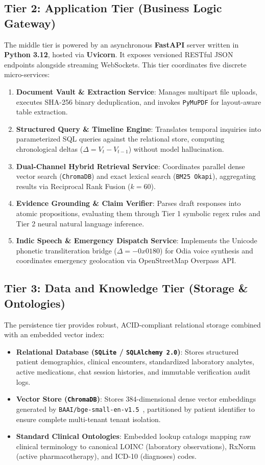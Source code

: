 \subsection{Tier 2: Application Tier (Business Logic Gateway)}
The middle tier is powered by an asynchronous \textbf{FastAPI} server written in \textbf{Python 3.12}, hosted via \textbf{Uvicorn}. It exposes versioned RESTful JSON endpoints alongside streaming WebSockets. This tier coordinates five discrete micro-services:
\begin{enumerate}
    \item \textbf{Document Vault \& Extraction Service}: Manages multipart file uploads, executes SHA-256 binary deduplication, and invokes \texttt{PyMuPDF} for layout-aware table extraction.
    \item \textbf{Structured Query \& Timeline Engine}: Translates temporal inquiries into parameterized SQL queries against the relational store, computing chronological deltas ($\Delta = V_t - V_{t-1}$) without model hallucination.
    \item \textbf{Dual-Channel Hybrid Retrieval Service}: Coordinates parallel dense vector search (\texttt{ChromaDB}) and exact lexical search (\texttt{BM25 Okapi}), aggregating results via Reciprocal Rank Fusion ($k=60$).
    \item \textbf{Evidence Grounding \& Claim Verifier}: Parses draft responses into atomic propositions, evaluating them through Tier 1 symbolic regex rules and Tier 2 neural natural language inference.
    \item \textbf{Indic Speech \& Emergency Dispatch Service}: Implements the Unicode phonetic transliteration bridge ($\Delta = -0x0180$) for Odia voice synthesis and coordinates emergency geolocation via OpenStreetMap Overpass API.
\end{enumerate}

\subsection{Tier 3: Data and Knowledge Tier (Storage \& Ontologies)}
The persistence tier provides robust, ACID-compliant relational storage combined with an embedded vector index:
\begin{itemize}
    \item \textbf{Relational Database (\texttt{SQLite} / \texttt{SQLAlchemy 2.0})}: Stores structured patient demographics, clinical encounters, standardized laboratory analytes, active medications, chat session histories, and immutable verification audit logs.
    \item \textbf{Vector Store (\texttt{ChromaDB})}: Stores $384$-dimensional dense vector embeddings generated by \texttt{BAAI/bge-small-en-v1.5}~\cite{xiao2023bge}, partitioned by patient identifier to ensure complete multi-tenant tenant isolation.
    \item \textbf{Standard Clinical Ontologies}: Embedded lookup catalogs mapping raw clinical terminology to canonical LOINC (laboratory observations), RxNorm (active pharmacotherapy), and ICD-10 (diagnoses) codes.
\end{itemize}


